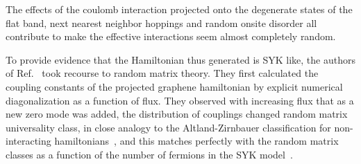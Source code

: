 \par
The effects of the coulomb interaction projected onto the degenerate states of the flat band, next nearest neighbor hoppings and random onsite disorder all contribute to make the effective interactions seem almost completely random. 

\par
To provide evidence that the Hamiltonian thus generated is SYK like, the authors of  Ref.~\cite{Chen2018} took recourse to random matrix theory. They first calculated the coupling constants of the projected graphene hamiltonian by explicit numerical diagonalization as a function of flux. They observed with increasing flux that as a new zero mode was added, the distribution of couplings changed random matrix universality class, in close analogy to the Altland-Zirnbauer classification for non-interacting hamiltonians~\cite{altland1997nonstandard,fidkowski2010effects,fidkowski2011topological}, and this matches perfectly with the random matrix classes as a function of the number of fermions in the SYK model~\cite{garcia2016spectral,behrends2019tenfold,you2017sachdev}. 

